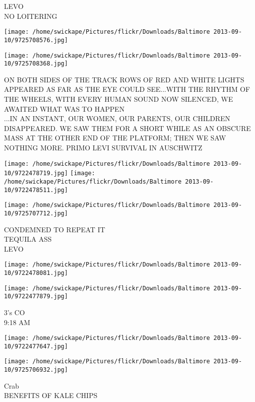 \documentclass[10pt,letterpaper]{article}
\begin{document}
LEVO\\
NO LOITERING\\
\pagebreak

\texttt{[image: /home/swickape/Pictures/flickr/Downloads/Baltimore 2013-09-10/9725708576.jpg]}

\vspace{0.25in}
\texttt{[image: /home/swickape/Pictures/flickr/Downloads/Baltimore 2013-09-10/9725708368.jpg]}

ON BOTH SIDES OF THE TRACK ROWS OF RED AND WHITE LIGHTS APPEARED AS FAR AS THE EYE COULD SEE...WITH THE RHYTHM OF THE WHEELS, WITH EVERY HUMAN SOUND NOW SILENCED, WE AWAITED WHAT WAS TO HAPPEN\\
...IN AN INSTANT, OUR WOMEN, OUR PARENTS, OUR CHILDREN DISAPPEARED.  WE SAW THEM FOR A SHORT WHILE AS AN OBSCURE MASS AT THE OTHER END OF THE PLATFORM; THEN WE SAW NOTHING MORE.  PRIMO LEVI  SURVIVAL IN AUSCHWITZ\\
\pagebreak

\texttt{[image: /home/swickape/Pictures/flickr/Downloads/Baltimore 2013-09-10/9722478719.jpg]}
\texttt{[image: /home/swickape/Pictures/flickr/Downloads/Baltimore 2013-09-10/9722478511.jpg]}

\texttt{[image: /home/swickape/Pictures/flickr/Downloads/Baltimore 2013-09-10/9725707712.jpg]}

CONDEMNED TO REPEAT IT\\
TEQUILA ASS\\
LEVO\\
\pagebreak

\texttt{[image: /home/swickape/Pictures/flickr/Downloads/Baltimore 2013-09-10/9722478081.jpg]}

\vspace{0.25in}
\texttt{[image: /home/swickape/Pictures/flickr/Downloads/Baltimore 2013-09-10/9722477879.jpg]}

3's CO\\
9:18 AM\\
\pagebreak

\texttt{[image: /home/swickape/Pictures/flickr/Downloads/Baltimore 2013-09-10/9722477647.jpg]}

\vspace{0.25in}
\texttt{[image: /home/swickape/Pictures/flickr/Downloads/Baltimore 2013-09-10/9725706932.jpg]}

Crab\\
BENEFITS OF KALE CHIPS\\
\pagebreak
\end{document}
